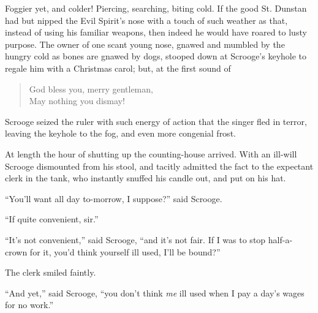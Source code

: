 \documentclass[paper=5.5in:8.5in,BCOR=10mm,twoside,DIV=15,12pt,usegeometry,openany]{scrbook} %
\begin{document}
Foggier yet, and colder! Piercing, searching, biting cold. If the good St. Dunstan had but nipped the Evil Spirit's nose with a touch of such weather as that, instead of using his familiar weapons, then indeed he would have roared to lusty purpose. The owner of one scant young nose, gnawed and mumbled by the hungry cold as bones are gnawed by dogs, stooped down at Scrooge's keyhole to regale him with a Christmas carol; but, at the first sound of 
\blockquote{God bless you, merry gentleman,\\
May nothing you dismay!}

Scrooge seized the ruler with such energy of action that the singer fled in terror, leaving the keyhole to the fog, and even more congenial frost.

At length the hour of shutting up the counting-house arrived. With an ill-will Scrooge dismounted from his stool, and tacitly admitted the fact to the expectant clerk in the tank, who instantly snuffed his candle out, and put on his hat.

\enquote{You'll want all day to-morrow, I suppose?} said Scrooge.

\enquote{If quite convenient, sir.}

\enquote{It's not convenient,} said Scrooge, \enquote{and it's not fair. If I was to stop half-a-crown for it, you'd think yourself ill used, I'll be bound?}

The clerk smiled faintly.

\enquote{And yet,} said Scrooge, \enquote{you don't think \textit{me} ill used when I pay a day's wages for no work.}
\end{document}
